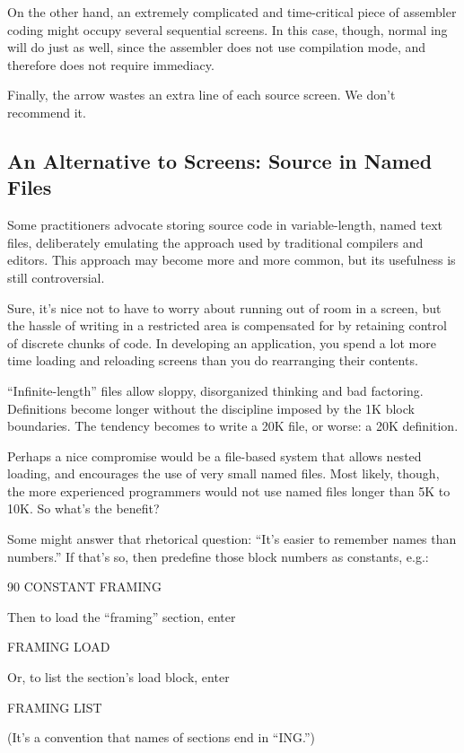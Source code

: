 On the other hand, an extremely complicated and time-critical piece
of assembler coding might occupy several sequential screens.  In this
case, though, normal ing will do just as well, since the
assembler does not use compilation mode, and therefore does not
require immediacy.

Finally, the arrow wastes an extra line of each source screen.  We
don't recommend it.%
%
%
%
%

\subsection{An Alternative to Screens: Source in Named Files}%

%
Some \Forth{} practitioners advocate storing source code in
variable-length, named text files, deliberately emulating the approach
used by traditional compilers and editors.  This approach may become
more and more common, but its usefulness is still controversial.

Sure, it's nice not to have to worry about running out of room in a
screen, but the hassle of writing in a restricted area is compensated
for by retaining control of discrete chunks of code.  In developing an
application, you spend a lot more time loading and reloading screens
than you do rearranging their contents.

``Infinite-length'' files allow sloppy, disorganized thinking and bad
factoring.  Definitions become longer without the discipline imposed
by the 1K block boundaries.  The tendency becomes to write a 20K file,
or worse: a 20K definition.

Perhaps a nice compromise would be a file-based system that allows
nested loading, and encourages the use of very small named files.
Most likely, though, the more experienced \Forth{} programmers would
not use named files longer than 5K to 10K.  So what's the benefit?%

Some might answer that rhetorical question: ``It's easier to remember
names than numbers.'' If that's so, then predefine those block numbers
as constants, e.g.:
\begin{Code}
90 CONSTANT FRAMING
\end{Code}
Then to load the ``framing'' section, enter
\begin{Code}
FRAMING LOAD
\end{Code}
Or, to list the section's load block, enter
\begin{Code}
FRAMING LIST
\end{Code}
(It's a convention that names of sections end in ``ING.'')

